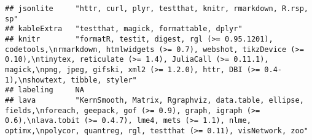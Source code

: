 \documentclass[]{article}
\begin{document}
\begin{verbatim}
## jsonlite     "httr, curl, plyr, testthat, knitr, rmarkdown, R.rsp, sp"                                                                                                                                                                                                                                                                                                                                                                                                                                                                                                                                 
## kableExtra   "testthat, magick, formattable, dplyr"                                                                                                                                                                                                                                                                                                                                                                                                                                                                                                                                                    
## knitr        "formatR, testit, digest, rgl (>= 0.95.1201), codetools,\nrmarkdown, htmlwidgets (>= 0.7), webshot, tikzDevice (>= 0.10),\ntinytex, reticulate (>= 1.4), JuliaCall (>= 0.11.1), magick,\npng, jpeg, gifski, xml2 (>= 1.2.0), httr, DBI (>= 0.4-1),\nshowtext, tibble, styler"                                                                                                                                                                                                                                                                                                             
## labeling     NA                                                                                                                                                                                                                                                                                                                                                                                                                                                                                                                                                                                        
## lava         "KernSmooth, Matrix, Rgraphviz, data.table, ellipse, fields,\nforeach, geepack, gof (>= 0.9), graph, igraph (>= 0.6),\nlava.tobit (>= 0.4.7), lme4, mets (>= 1.1), nlme, optimx,\npolycor, quantreg, rgl, testthat (>= 0.11), visNetwork, zoo"                                                                                                                                                                                                                                                                                                                                            

\end{verbatim}
\end{document}
